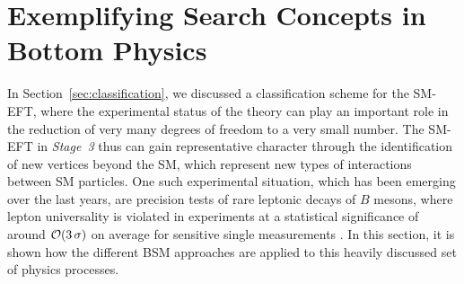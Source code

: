 


\section{Exemplifying Search Concepts in Bottom Physics}\label{sec:BphysicsConcepts}

In Section~\ref{sec:classification}, we discussed a classification
scheme for the SM-EFT, where the experimental status of the theory can
play an important role in the reduction of very many degrees of
freedom to a very small number. The SM-EFT in \emph{Stage~3} thus can
gain representative character through the identification of new
vertices beyond the SM, which represent new types of interactions
between SM particles. One such experimental situation, which has been
emerging over the last years, are precision tests of rare leptonic
decays of $B$ mesons, where lepton universality is
violated in experiments
at a statistical significance of around ${\cal O}(3\,\sigma)$ on
average for sensitive single measurements \citep{Aaij:2015oid,Aaij:2017vbb,Aaij:2019wad,Abdesselam:2019dgh,Abdesselam:2019wac,Buttazzo:2017ixm}.
In this section, it is shown how the different BSM approaches are applied to this heavily discussed set of physics processes.

